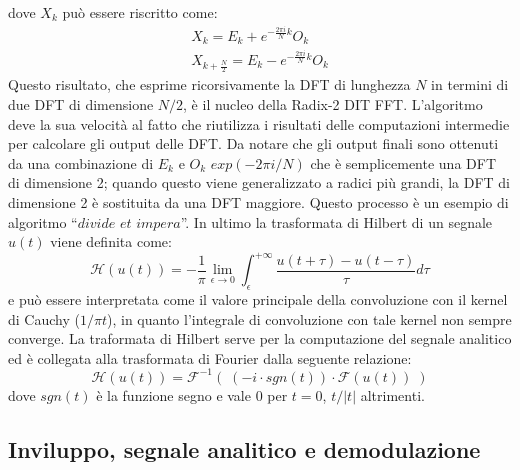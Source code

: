 \documentclass[12pt,a4paper, twoside, openright]{report}
\begin{document}
dove $X_k$ può essere riscritto come:
\begin{align}
	X_k = E_k+ e^{-\frac{2 \pi i}{N}k}O_k \\
	X_{k+\frac{N}{2}} = E_k -e^{-\frac{2 \pi i}{N}k}O_k
\end{align}
Questo risultato, che esprime ricorsivamente la DFT di lunghezza $N$ in termini di due DFT di dimensione $N/2$, è il nucleo della Radix-2 DIT FFT. L’algoritmo deve la sua velocità al fatto che riutilizza i risultati delle computazioni intermedie per calcolare gli output delle DFT.
Da notare che gli output finali sono ottenuti da una combinazione di $E_k$ e $O_k$ $exp(-2 \pi i /N)$ che è semplicemente una DFT di dimensione 2; quando questo viene generalizzato a radici più grandi, la DFT di dimensione 2 è sostituita da una DFT maggiore.
Questo processo è un esempio di algoritmo “$divide$ $et$ $impera$”.
In ultimo la trasformata di Hilbert di un segnale $u(t)$ viene definita come:
\begin{equation}
	\mathcal{H}(u(t)) = - \frac{1}{\pi} \lim_{\epsilon \to 0}\int_{\epsilon}^{+\infty} 			\frac{u(t+\tau)-u(t-\tau)}{\tau} d\tau
\end{equation}
e può essere interpretata come il valore principale della convoluzione con il kernel di Cauchy ($1/\pi t$), in quanto l'integrale di convoluzione con tale kernel non sempre converge.
La traformata di Hilbert serve per la computazione del segnale analitico ed è collegata alla trasformata di Fourier dalla seguente relazione:
\begin{equation}
	\mathcal{H}(u(t)) = \mathcal{F}^{-1}(\;(-i \cdot sgn(t)) \cdot \mathcal{F}(u(t))\;) 
\end{equation}
dove $sgn(t)$ è la funzione segno e vale 0 per $t=0$, $t/|t|$ altrimenti.



\subsection{Inviluppo, segnale analitico e demodulazione}
\end{document}
